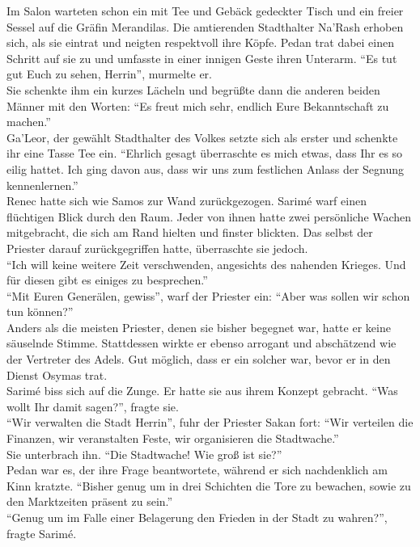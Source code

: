 Im Salon warteten schon ein mit Tee und Gebäck gedeckter Tisch und ein freier Sessel auf die Gräfin 
Merandilas. Die amtierenden Stadthalter Na'Rash erhoben sich, als sie eintrat und neigten 
respektvoll ihre Köpfe. Pedan trat dabei einen Schritt auf sie zu und umfasste in einer innigen 
Geste ihren Unterarm. ``Es tut gut Euch zu sehen, Herrin'', murmelte er.\\
Sie schenkte ihm ein kurzes Lächeln und begrüßte dann die anderen beiden Männer mit den Worten: 
``Es freut mich sehr, endlich Eure Bekanntschaft zu machen.''\\
Ga'Leor, der gewählt Stadthalter des Volkes setzte sich als erster und schenkte ihr eine Tasse Tee 
ein. ``Ehrlich gesagt überraschte es mich etwas, dass Ihr es so eilig hattet. Ich ging davon aus, 
dass wir uns zum festlichen Anlass der Segnung kennenlernen.''\\
Renec hatte sich wie Samos zur Wand zurückgezogen. Sarimé warf einen flüchtigen Blick durch den 
Raum. Jeder von ihnen hatte zwei persönliche Wachen mitgebracht, die sich am Rand hielten und 
finster blickten. Das selbst der Priester darauf zurückgegriffen hatte, überraschte sie jedoch.\\
``Ich will keine weitere Zeit verschwenden, angesichts des nahenden Krieges. Und für diesen gibt 
es einiges zu besprechen.''\\
``Mit Euren Generälen, gewiss'', warf der Priester ein: ``Aber was sollen wir schon tun können?''\\
Anders als die meisten Priester, denen sie bisher begegnet war, hatte er keine säuselnde Stimme. 
Stattdessen wirkte er ebenso arrogant und abschätzend wie der Vertreter des Adels. Gut möglich, 
dass er ein solcher war, bevor er in den Dienst Osymas trat.\\
Sarimé biss sich auf die Zunge. Er hatte sie aus ihrem Konzept gebracht. ``Was wollt Ihr damit 
sagen?'', fragte sie.\\
``Wir verwalten die Stadt Herrin'', fuhr der Priester Sakan fort: ``Wir verteilen die Finanzen, wir 
veranstalten Feste, wir organisieren die Stadtwache.''\\
Sie unterbrach ihn. ``Die Stadtwache! Wie groß ist sie?''\\
Pedan war es, der ihre Frage beantwortete, während er sich nachdenklich am Kinn kratzte. ``Bisher 
genug um in drei Schichten die Tore zu bewachen, sowie zu den Marktzeiten präsent zu sein.''\\
``Genug um im Falle einer Belagerung den Frieden in der Stadt zu wahren?'', fragte Sarimé.\\
